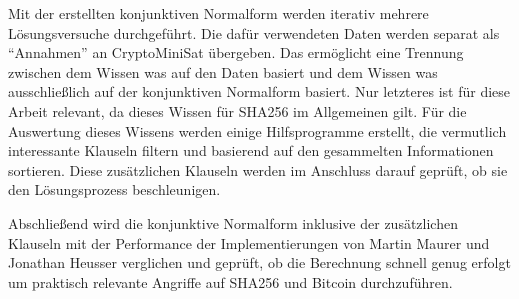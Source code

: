 Mit der erstellten konjunktiven Normalform werden iterativ mehrere Lösungsversuche durchgeführt. Die dafür verwendeten
Daten werden separat als "`Annahmen"' an CryptoMiniSat übergeben. Das ermöglicht eine Trennung zwischen dem Wissen was
auf den Daten basiert und dem Wissen was ausschließlich auf der konjunktiven Normalform basiert. Nur letzteres ist für
diese Arbeit relevant, da dieses Wissen für SHA256 im Allgemeinen gilt. Für die Auswertung dieses Wissens werden einige
Hilfsprogramme erstellt, die vermutlich interessante Klauseln filtern und basierend auf den gesammelten Informationen
sortieren. Diese zusätzlichen Klauseln werden im Anschluss darauf geprüft, ob sie den Lösungsprozess beschleunigen.

Abschließend wird die konjunktive Normalform inklusive der zusätzlichen Klauseln mit der Performance der Implementierungen
von Martin Maurer und Jonathan Heusser verglichen und geprüft, ob die Berechnung schnell genug erfolgt um praktisch relevante
Angriffe auf SHA256 und Bitcoin durchzuführen.